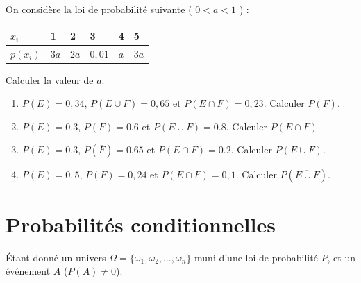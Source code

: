 \documentclass[main.tex]{subfiles}
\begin{document}
\begin{exercise}\hfill \\ 
On considère la loi de probabilité suivante  ( $0<a<1$ ) :
\begin{center}
	\renewcommand{\arraystretch}{1.5} 
	\begin{tabular}{|L{1.5cm}|C{1cm}|C{1cm}|C{1cm}|C{1cm}|C{1cm}|}
		\hline
		$x_i$ &	1	& 2	& 3 &	4 &	5\\ \hline
		$p(x_i)$ &	$3a$ &	$2a$ &	$0,01$ &	$a$ &	$3a$ \\ \hline
	\end{tabular}
\end{center} 
Calculer la valeur de $a$.
\end{exercise}
\begin{exercise}\hfill 
\begin{enumerate}[label=\arabic*), leftmargin=*]
	\item $P(E)=0,34$, $P(E\cup F)=0,65$ et $P(E\cap F)=0,23$. Calculer $P(F)$.
	\item $P(E)=0.3$, $P(F)=0.6$ et $P(E\cup F)=0.8$. Calculer $P(E\cap F)$
	\item $P(E)=0.3$, $P(\overline{F})=0.65$ et $P(E\cap F)=0.2$. Calculer $P(E\cup F)$.
	\item $P(E)=0,5$, $P(F)=0,24$ et $P(E\cap F)=0,1$. Calculer $P(\overline{E\cup F})$.
\end{enumerate} 
\end{exercise}

%	 

\newpage 
{}  
\pagestyle{scrheadings} %

\onehalfspacing  

\section{Probabilités conditionnelles}
\noindent Étant donné un univers $\Omega=\{ \omega_1, \omega_2, \ldots , \omega_n\}$ muni d'une loi de probabilité $P$, et un événement $A$ ($P(A) \neq  0$).  \vspace{-2em}
\end{document}
